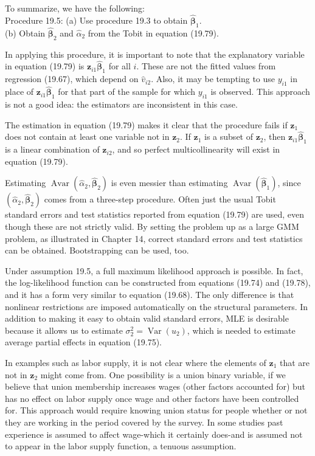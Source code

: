 \documentclass[10pt]{article}
\begin{document}
To summarize, we have the following:\\
Procedure 19.5: (a) Use procedure 19.3 to obtain $\hat{\boldsymbol{\beta}}_{1}$.\\
(b) Obtain $\hat{\boldsymbol{\beta}}_{2}$ and $\hat{\alpha}_{2}$ from the Tobit in equation (19.79).

In applying this procedure, it is important to note that the explanatory variable in equation (19.79) is $\mathbf{z}_{i 1} \hat{\boldsymbol{\beta}}_{1}$ for all $i$. These are not the fitted values from regression (19.67), which depend on $\hat{v}_{i 2}$. Also, it may be tempting to use $y_{i 1}$ in place of $\mathbf{z}_{i 1} \hat{\boldsymbol{\beta}}_{1}$ for that part of the sample for which $y_{i 1}$ is observed. This approach is not a good idea: the estimators are inconsistent in this case.

The estimation in equation (19.79) makes it clear that the procedure fails if $\mathbf{z}_{1}$ does not contain at least one variable not in $\mathbf{z}_{2}$. If $\mathbf{z}_{1}$ is a subset of $\mathbf{z}_{2}$, then $\mathbf{z}_{i 1} \hat{\boldsymbol{\beta}}_{1}$ is a linear combination of $\mathbf{z}_{i 2}$, and so perfect multicollinearity will exist in equation (19.79).

Estimating $\operatorname{Avar}\left(\hat{\alpha}_{2}, \hat{\boldsymbol{\beta}}_{2}\right)$ is even messier than estimating $\operatorname{Avar}\left(\hat{\boldsymbol{\beta}}_{1}\right)$, since $\left(\hat{\alpha}_{2}, \hat{\boldsymbol{\beta}}_{2}\right)$ comes from a three-step procedure. Often just the usual Tobit standard errors and test statistics reported from equation (19.79) are used, even though these are not strictly valid. By setting the problem up as a large GMM problem, as illustrated in Chapter 14, correct standard errors and test statistics can be obtained. Bootstrapping can be used, too.

Under assumption 19.5, a full maximum likelihood approach is possible. In fact, the log-likelihood function can be constructed from equations (19.74) and (19.78), and it has a form very similar to equation (19.68). The only difference is that nonlinear restrictions are imposed automatically on the structural parameters. In addition to making it easy to obtain valid standard errors, MLE is desirable because it allows us to estimate $\sigma_{2}^{2}=\operatorname{Var}\left(u_{2}\right)$, which is needed to estimate average partial effects in equation (19.75).

In examples such as labor supply, it is not clear where the elements of $\mathbf{z}_{1}$ that are not in $\mathbf{z}_{2}$ might come from. One possibility is a union binary variable, if we believe that union membership increases wages (other factors accounted for) but has no effect on labor supply once wage and other factors have been controlled for. This approach would require knowing union status for people whether or not they are working in the period covered by the survey. In some studies past experience is assumed to affect wage-which it certainly does-and is assumed not to appear in the labor supply function, a tenuous assumption.
\end{document}
